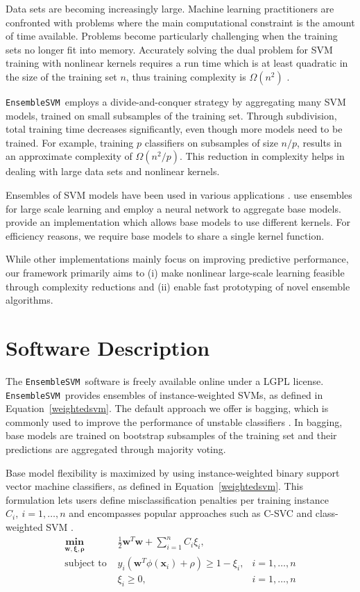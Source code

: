 \documentclass[twoside,11pt]{article}
\newcommand{\esvm}{\texttt{\selectfont EnsembleSVM}}
\begin{document}
Data sets are becoming increasingly large. Machine learning practitioners are confronted with
problems where the main computational constraint is the amount of time available. Problems become particularly challenging when
the training sets no longer fit into memory. Accurately solving the dual problem
for SVM training with nonlinear kernels requires a run time which is at least
quadratic in the size of the training set $n$, thus training complexity is $\Omega(n^2)$
\citep{bottou07svm,NL09a}.

\esvm\ employs a divide-and-conquer strategy by aggregating many SVM models,
trained on small subsamples of the training set. 
Through subdivision, total training time decreases significantly, even though
more models need to be trained. For example, training $p$
classifiers on subsamples of size $n/p$, results in an approximate complexity
of $\Omega(n^2/p)$. This reduction in complexity helps in dealing
with large data sets and nonlinear kernels.


Ensembles of SVM models have been used in various applications
\citep{Wang20096466,5646323,citeulike:9860864}.
\citet{Collobert02} use ensembles for large scale learning and employ a neural
network to aggregate base models.
\citet{Valentini03lowbias} provide an implementation which allows base models to use different kernels.
For efficiency reasons, we require base models to share a single kernel function. 

While other implementations mainly focus on improving predictive performance, our framework
primarily aims to (i) make nonlinear large-scale learning feasible through complexity reductions and (ii) enable fast prototyping of novel ensemble algorithms.

\section{Software Description}
The \esvm\ software is freely available online under a
LGPL license. \esvm\ provides ensembles of
instance-weighted SVMs, as defined in Equation~\eqref{weightedsvm}.
The default approach we offer is bagging, which is commonly used to improve the
performance of unstable classifiers \citep{Breiman:1996:BP:231986.231989}. In
bagging, base models are trained on bootstrap subsamples of the training set
and their predictions are aggregated through majority voting.

Base model flexibility is maximized by using instance-weighted binary support
vector machine classifiers, as defined in Equation~\eqref{weightedsvm}. This formulation lets users define
misclassification penalties per training instance $C_i,\ i=1,\ldots,n$ and
encompasses popular approaches such as C-SVC and class-weighted SVM
\citep{Cortes:1995:SN:218919.218929, osuna1997}.
\begin{align}
\mathbf{\min_{\mathbf{w},\mathbf{\xi},\rho} } \ &
\frac{1}{2}\mathbf{w}^T\mathbf{w}+\sum_{i=1}^n C_i \xi_i,
\label{weightedsvm} \\
\text{subject\ to }  &y_i(\mathbf{w}^T\phi(\mathbf{x}_i)+\rho)\geq 1-\xi_i,
&i=1,\ldots,n \nonumber \\
&\xi_i \geq 0, &i=1,\ldots,n \nonumber  
\end{align}
\end{document}
